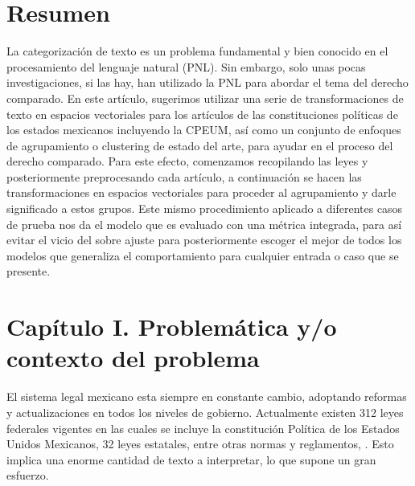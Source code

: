 \documentclass[12pt]{article}
\begin{document}
	\section*{Resumen}
	La categorización de texto es un problema fundamental y bien conocido en el procesamiento del lenguaje natural (PNL). Sin embargo, solo unas pocas investigaciones, si las hay, han utilizado la PNL para abordar el tema del derecho comparado. En este artículo, sugerimos utilizar una serie de transformaciones de texto en espacios vectoriales para los artículos de las constituciones políticas de los estados mexicanos incluyendo la CPEUM, así como un conjunto de enfoques de agrupamiento o clustering de estado del arte, para ayudar en el proceso del derecho comparado. Para este efecto, comenzamos recopilando las leyes y posteriormente preprocesando cada artículo, a continuación se hacen las transformaciones en espacios vectoriales para proceder al agrupamiento y darle significado a estos grupos. Este mismo procedimiento aplicado a diferentes casos de prueba nos da el modelo que es evaluado con una métrica integrada, para así evitar el vicio del sobre ajuste para posteriormente escoger el mejor de todos los modelos que generaliza el comportamiento para cualquier entrada o caso que se presente. 
	
	\newpage
	
	
	
	\section{Capítulo I. Problemática y/o contexto del problema}
	\label{section:problemática}
			
		
		
		El sistema legal mexicano esta siempre en constante cambio, adoptando reformas y actualizaciones en todos los niveles de gobierno. Actualmente existen 312 leyes federales vigentes en las cuales se incluye la constitución Política de los Estados Unidos Mexicanos, 32 leyes estatales, entre otras normas y reglamentos, \cite{Parlamentarios2020}. Esto implica una enorme cantidad de texto a interpretar, lo que supone un gran esfuerzo.
		
\end{document}
